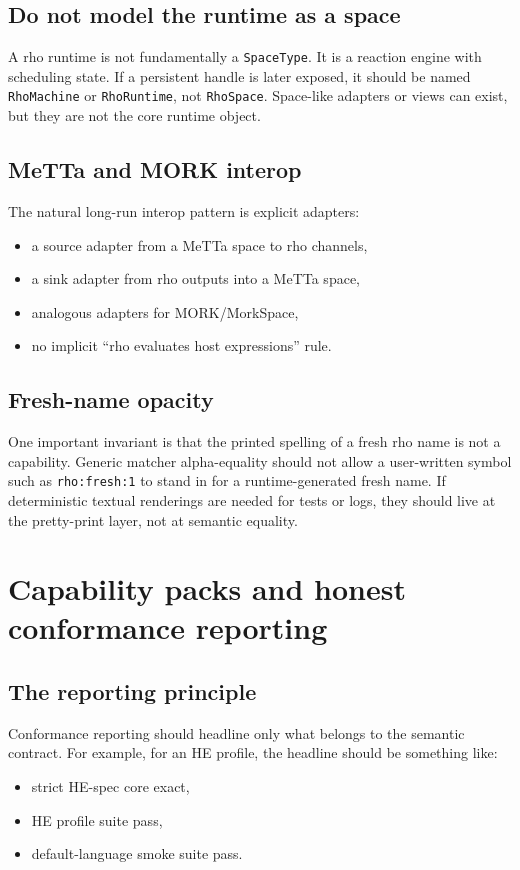\documentclass[11pt]{article}
\begin{document}
\subsection{Do not model the runtime as a space}

A rho runtime is not fundamentally a \texttt{SpaceType}. It is a reaction engine with scheduling state. If a persistent handle is later exposed, it should be named \texttt{RhoMachine} or \texttt{RhoRuntime}, not \texttt{RhoSpace}. Space-like adapters or views can exist, but they are not the core runtime object.

\subsection{MeTTa and MORK interop}

The natural long-run interop pattern is explicit adapters:
\begin{itemize}
    \item a source adapter from a MeTTa space to rho channels,
    \item a sink adapter from rho outputs into a MeTTa space,
    \item analogous adapters for MORK/MorkSpace,
    \item no implicit ``rho evaluates host expressions'' rule.
\end{itemize}

\subsection{Fresh-name opacity}

One important invariant is that the printed spelling of a fresh rho name is not a capability. Generic matcher alpha-equality should not allow a user-written symbol such as \texttt{rho:fresh:1} to stand in for a runtime-generated fresh name. If deterministic textual renderings are needed for tests or logs, they should live at the pretty-print layer, not at semantic equality.

\section{Capability packs and honest conformance reporting}

\subsection{The reporting principle}

Conformance reporting should headline only what belongs to the semantic contract. For example, for an HE profile, the headline should be something like:
\begin{itemize}
    \item strict HE-spec core exact,
    \item HE profile suite pass,
    \item default-language smoke suite pass.
\end{itemize}
\end{document}
